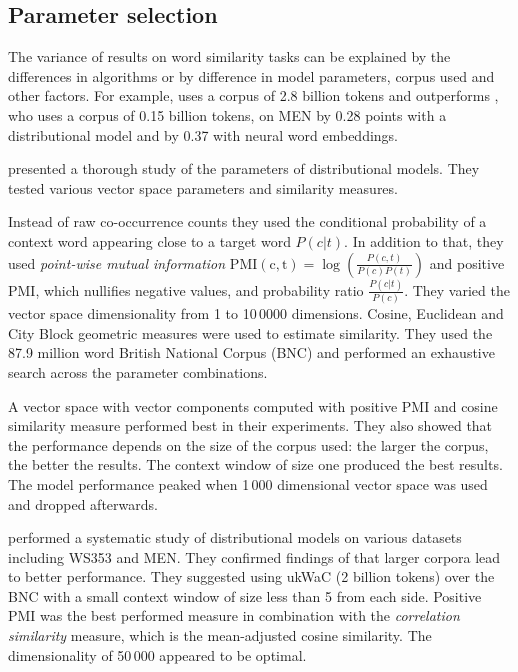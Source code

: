 \subsection{Parameter selection}
\label{sec:parameter-selection-intro}

The variance of results on word similarity tasks can be explained by the differences in algorithms or by difference in model parameters, corpus used and other factors. For example,  uses a corpus of 2.8 billion tokens and outperforms , who uses a corpus of 0.15 billion tokens, on MEN by 0.28 points with a distributional model and by 0.37 with neural word embeddings.

 presented a thorough study of the parameters of distributional models. They tested various vector space parameters and similarity measures.

Instead of raw co-occurrence counts they used the conditional probability of a context word appearing close to a target word $P(c|t)$. In addition to that, they used \emph{point-wise mutual information} $\operatorname{PMI(c,t)} = \log\left(\frac{P(c,t)}{P(c)P(t)}\right)$ and positive PMI, which nullifies negative values, and probability ratio $\frac{P(c|t)}{P(c)}$. They varied the vector space dimensionality from 1 to 10\,0000 dimensions.  Cosine, Euclidean and City Block geometric measures were used to estimate similarity. They used the 87.9 million word British National Corpus (BNC) and performed an exhaustive search across the parameter combinations.

A vector space with vector components computed with positive PMI and cosine similarity measure performed best in their experiments. They also showed that the performance depends on the size of the corpus used: the larger the corpus, the better the results. The context window of size one produced the best results. The model performance peaked when 1\,000 dimensional vector space was used and dropped afterwards.

 performed a systematic study of distributional models on various datasets including WS353 and MEN. They confirmed findings of  that larger corpora lead to better performance. They suggested using ukWaC (2 billion tokens) over the BNC with a small context window of size less than 5 from each side. Positive PMI was the best performed measure in combination with the \emph{correlation similarity} measure, which is the mean-adjusted cosine similarity. The dimensionality of 50\,000 appeared to be optimal.

